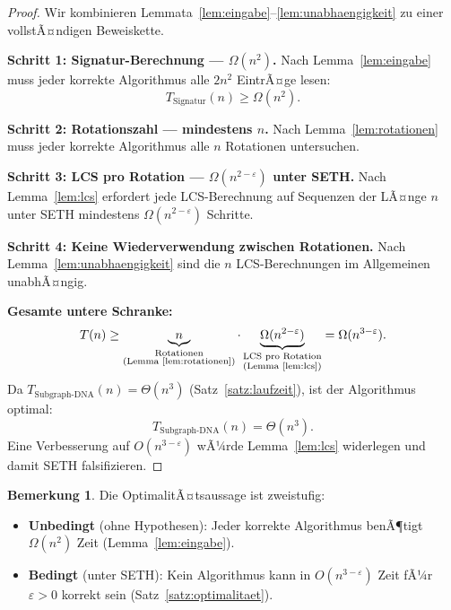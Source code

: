 ﻿\documentclass[a4paper,12pt]{article}
\theoremstyle{definition}
\newtheorem{bemerkung}{Bemerkung}
\begin{document}
\begin{proof}
    Wir kombinieren Lemmata~\ref{lem:eingabe}--\ref{lem:unabhaengigkeit}
    zu einer vollstÃ¤ndigen Beweiskette.

    \textbf{Schritt 1: Signatur-Berechnung --- $\Omega(n^2)$.}
    Nach Lemma~\ref{lem:eingabe} muss jeder korrekte Algorithmus alle $2n^2$
    EintrÃ¤ge lesen:
    \[
        T_{\text{Signatur}}(n) \geq \Omega(n^2).
    \]

    \textbf{Schritt 2: Rotationszahl --- mindestens $n$.}
    Nach Lemma~\ref{lem:rotationen} muss jeder korrekte Algorithmus alle $n$
    Rotationen untersuchen.

    \textbf{Schritt 3: LCS pro Rotation --- $\Omega(n^{2-\varepsilon})$ unter SETH.}
    Nach Lemma~\ref{lem:lcs} erfordert jede LCS-Berechnung auf Sequenzen
    der LÃ¤nge $n$ unter SETH mindestens $\Omega(n^{2-\varepsilon})$ Schritte.

    \textbf{Schritt 4: Keine Wiederverwendung zwischen Rotationen.}
    Nach Lemma~\ref{lem:unabhaengigkeit} sind die $n$ LCS-Berechnungen im
    Allgemeinen unabhÃ¤ngig.

    \textbf{Gesamte untere Schranke:}
    \[
        T(n) \geq
        \underbrace{n}_{\substack{\text{Rotationen}\\\text{(Lemma \ref{lem:rotationen})}}}
        \cdot
        \underbrace{\Omega(n^{2-\varepsilon})}_{\substack{\text{LCS pro Rotation}\\
        \text{(Lemma \ref{lem:lcs})}}}
        = \Omega(n^{3-\varepsilon}).
    \]
    Da $T_{\text{Subgraph-DNA}}(n) = \Theta(n^3)$ (Satz~\ref{satz:laufzeit}),
    ist der Algorithmus optimal:
    \[
        T_{\text{Subgraph-DNA}}(n) = \Theta(n^3).
    \]
    Eine Verbesserung auf $O(n^{3-\varepsilon})$ wÃ¼rde Lemma~\ref{lem:lcs}
    widerlegen und damit SETH falsifizieren. 
\end{proof}

\begin{bemerkung}
    Die OptimalitÃ¤tsaussage ist zweistufig:
    \begin{itemize}
        \item \textbf{Unbedingt} (ohne Hypothesen): Jeder korrekte Algorithmus
              benÃ¶tigt $\Omega(n^2)$ Zeit (Lemma~\ref{lem:eingabe}).
        \item \textbf{Bedingt} (unter SETH): Kein Algorithmus kann in
              $O(n^{3-\varepsilon})$ Zeit fÃ¼r $\varepsilon > 0$ korrekt sein
              (Satz~\ref{satz:optimalitaet}).
    \end{itemize}
\end{bemerkung}
\end{document}
